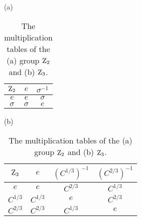 \begin{table}[h]
  \caption[ The multiplication tables of the $\textrm{Z}_{2}$ and $\textrm{Z}_{3}$]{
    The multiplication tables of the (a) group $\textrm{Z}_{2}$ and (b) $\textrm{Z}_{3}$.
  }
  \label{tab:C3MultTab}
  \begin{center}
    \centering
    (a)
    \begin{tabular}{c | c c}
      $\textrm{Z}_{2}$         & $e$        & $\sigma^{-1}$  \\ \hline
      $e$              & $e$        & $\sigma$   \\
      $\sigma$ & $\sigma$  & $e$         \\
    \end{tabular}
    \quad
    (b)
    \begin{tabular}{c | c c c}
      $\textrm{Z}_{3}$         & $e$        & $(C^{1/3})^{-1}$ & $(C^{2/3})^{-1}$ \\ \hline
      $e$              & $e$        & $C^{2/3}$ & $C^{1/3}$  \\
      $C^{1/3}$ & $C^{1/3}$  & $e$       & $C^{2/3}$   \\
      $C^{2/3}$ & $C^{2/3}$  & $C^{1/3}$ & $e$
    \end{tabular}
  \end{center}
\end{table}


